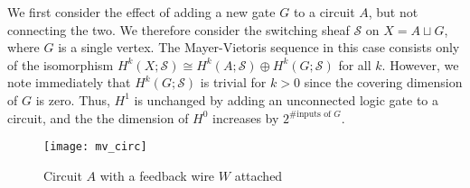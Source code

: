 \documentclass{amsart}
\theoremstyle{plain}
\theoremstyle{definition}
\begin{document}
We first consider the effect of adding a new gate $G$ to a circuit
$A$, but not connecting the two.  We therefore consider the switching
sheaf $\mathcal{S}$ on $X=A \sqcup G$, where $G$ is a single vertex.
The Mayer-Vietoris sequence in this case consists only of the
isomorphism $H^k(X;\mathcal{S}) \cong H^k(A;\mathcal{S}) \oplus
H^k(G;\mathcal{S})$ for all $k$.  However, we note immediately that
$H^k(G;\mathcal{S})$ is trivial for $k>0$ since the covering dimension
of $G$ is zero.  Thus, $H^1$ is unchanged by adding an unconnected
logic gate to a circuit, and the the dimension of $H^0$ increases by
$2^{\text{\# inputs of } G}$.  

\begin{figure}
\begin{center}
\texttt{[image: mv\_circ]}
\caption{Circuit $A$ with a feedback wire $W$ attached}
\label{mv_circ_fig}
\end{center}
\end{figure}
\end{document}
